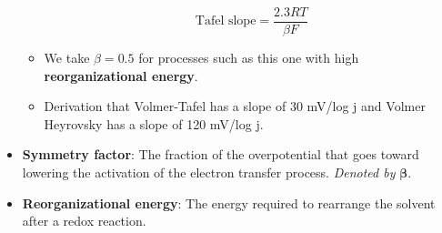 \documentclass[../notes.tex]{subfiles}
\begin{document}
\begin{itemize}
\begin{itemize}
        \begin{equation*}
            \text{Tafel slope} = \frac{2.3RT}{\beta F}
        \end{equation*}
        \item We take $\beta=0.5$ for processes such as this one with high \textbf{reorganizational energy}.
        \item Derivation that Volmer-Tafel has a slope of 30 mV/log j and Volmer Heyrovsky has a slope of 120 mV/log j.
    \end{itemize}
    \item \textbf{Symmetry factor}: The fraction of the overpotential that goes toward lowering the activation of the electron transfer process. \emph{Denoted by} $\bm{\beta}$.
    \item \textbf{Reorganizational energy}: The energy required to rearrange the solvent after a redox reaction.
\end{itemize}
\end{document}
